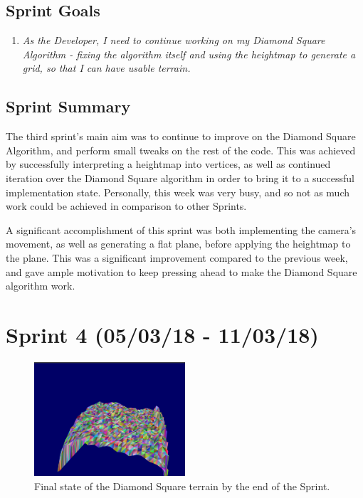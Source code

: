 \documentclass[a4paper,10pt]{report}
\begin{document}
\subsection{Sprint Goals}
\begin{enumerate}
    \item \textit{As the Developer, I need to continue working on my Diamond Square Algorithm - fixing the algorithm itself and using the heightmap to generate a grid, so that I can have usable terrain. }
\end{enumerate}
\subsection{Sprint Summary}
The third sprint's main aim was to continue to improve on the Diamond Square Algorithm, and perform small tweaks on the rest of the code. This was achieved by successfully interpreting a heightmap into vertices, as well as continued iteration over the Diamond Square algorithm in order to bring it to a successful implementation state. Personally, this week was very busy, and so not as much work could be achieved in comparison to other Sprints. \medskip

A significant accomplishment of this sprint was both implementing the camera's movement, as well as generating a flat plane, before applying the heightmap to the plane. This was  a significant improvement compared to the previous week, and gave ample motivation to keep pressing ahead to make the Diamond Square algorithm work. 

\clearpage
\section{Sprint 4 (05/03/18 - 11/03/18)}

\begin{figure}[h!]
    \centering
  \includegraphics[width=0.5\textwidth]{Images/Sprint-Images/Sprint4-7.png}
 \caption{Final state of the Diamond Square terrain by the end of the Sprint.}
 \label{fig:sprint4-1}
\end{figure}
\end{document}
